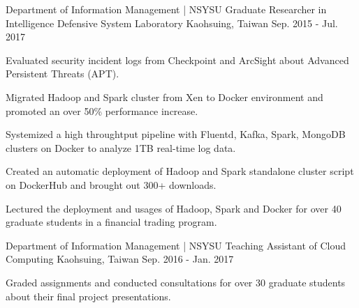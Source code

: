 


\begin{cventries}


\cventry
{Department of Information Management | NSYSU} %
{Graduate Researcher in Intelligence Defensive System Laboratory} %
{Kaohsuing, Taiwan} %
{Sep. 2015 - Jul. 2017} %
{ %
\begin{cvitems}
\item {Evaluated security incident logs from Checkpoint and ArcSight about Advanced Persistent Threats (APT).}
\item {Migrated Hadoop and Spark cluster from Xen to Docker environment and promoted an over 50\% performance increase.}
\item {Systemized a high throughtput pipeline with Fluentd, Kafka, Spark, MongoDB clusters on Docker to analyze 1TB real-time log data.}
\item {Created an automatic deployment of Hadoop and Spark standalone cluster script on DockerHub and brought out 300+ downloads.}
\item {Lectured the deployment and usages of Hadoop, Spark and Docker for over 40 graduate students in a financial trading program.}
\end{cvitems}
}


\cventry
{Department of Information Management | NSYSU} %
{Teaching Assistant of Cloud Computing} %
{Kaohsuing, Taiwan} %
{Sep. 2016 - Jan. 2017} %
{ %
\begin{cvitems}
\item {Graded assignments and conducted consultations for over 30 graduate students about their final project presentations.}
\end{cvitems}
}


\end{cventries}
